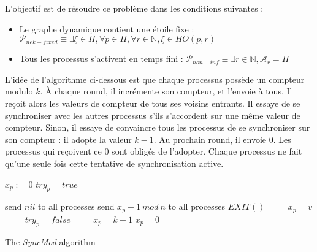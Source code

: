 \documentclass{article}
\begin{document}
L'objectif est de résoudre ce problème dans les conditions suivantes :
\begin{itemize}

	\item Le graphe dynamique contient une étoile fixe : $\mathcal{P}_{nek-fixed} \equiv \exists \xi \in \Pi, \forall p \in \Pi, \forall r \in \mathds{N}, \xi \in HO(p, r)$
	\item Tous les processus s'activent en temps fini : $\mathcal{P}_{non-inf} \equiv \exists r \in \mathds{N}, \mathcal{A}_r = \Pi$

\end{itemize}

L'idée de l'algorithme ci-dessous est que chaque processus possède un compteur modulo $k$. À chaque round, il incrémente son compteur, et l'envoie à tous.
Il reçoit alors les valeurs de compteur de tous ses voisins entrants. Il essaye de se synchroniser avec les autres processus s'ils s'accordent sur une même valeur de compteur.
Sinon, il essaye de convaincre tous les processus de se synchroniser sur son compteur : il adopte la valeur $k-1$. Au prochain round, il envoie $0$.
Les processus qui reçoivent ce $0$ sont obligés de l'adopter. Chaque processus ne fait qu'une seule fois cette tentative de synchronisation active.

\begin{algorithm}[htb]
\begin{distribalgo}[1]
\BLANK {}
  \STATE $x_p :=\, 0$ 
  \STATE $try_p = true$

\ENDINDENT \BLANK

    \STATE send $nil$ to all processes
  \ENDINDENT
\ENDINDENT
  \BLANK
{}
    \STATE send $x_p+1~mod~n$ to all processes
  \ENDINDENT
\ENDINDENT
  \BLANK
{}
	\STATE $EXIT()$ ~~~~
	\STATE $x_p = v$ ~~~~
	\STATE $try_p = false$ ~~~~
	\STATE $x_p = k - 1$
	\ELSE
	\STATE $x_p = 0$ ~~~~
	\ENDIF
  \ENDINDENT
\ENDINDENT 
\caption{The {\em SyncMod} algorithm} \label{algo:R}
\end{distribalgo}

\end{algorithm}
\end{document}
